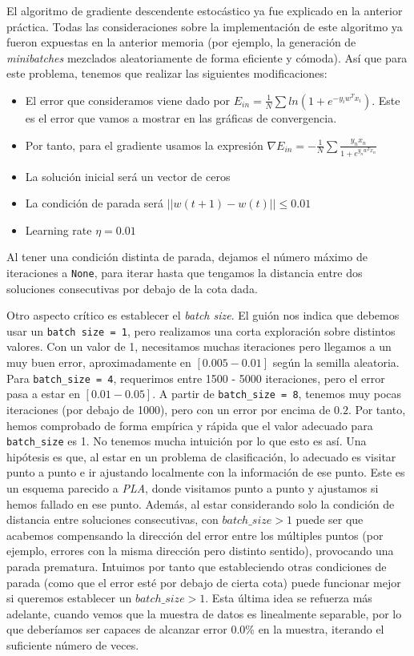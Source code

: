 \documentclass[11pt]{article}
\begin{document}
El algoritmo de gradiente descendente estocástico ya fue explicado en la anterior práctica. Todas las consideraciones sobre la implementación de este algoritmo ya fueron expuestas en la anterior memoria (por ejemplo, la generación de \emph{minibatches} mezclados aleatoriamente de forma eficiente y cómoda). Así que para este problema, tenemos que realizar las siguientes modificaciones:

\begin{itemize}
    \item El error que consideramos viene dado por $E_{in} = \frac{1}{N} \sum ln(1 + e^{-y_i w^T x_i})$. Este es el error que vamos a mostrar en las gráficas de convergencia.
    \item Por tanto, para el gradiente usamos la expresión $\nabla E_{in} = -\frac{1}{N} \sum \frac{y_n x_n}{1+e^{y_n w^T x_n}}$
    \item La solución inicial será un vector de ceros
    \item La condición de parada será $||w(t+1) - w(t)|| \leq 0.01$
    \item Learning rate $\eta = 0.01$
\end{itemize}

Al tener una condición distinta de parada, dejamos el número máximo de iteraciones a \lstinline{None}, para iterar hasta que tengamos la distancia entre dos soluciones consecutivas por debajo de la cota dada.

Otro aspecto crítico es establecer el \emph{batch size}. El guión nos indica que debemos usar un \lstinline{batch size = 1}, pero realizamos una corta exploración sobre distintos valores. Con un valor de 1, necesitamos muchas iteraciones pero llegamos a un muy buen error, aproximadamente en $[0.005 - 0.01]$ según la semilla aleatoria. Para \lstinline{batch_size = 4}, requerimos entre 1500 - 5000 iteraciones, pero el error pasa a estar en $[0.01 - 0.05]$. A partir de \lstinline{batch_size = 8}, tenemos muy pocas iteraciones (por debajo de 1000), pero con un error por encima de $0.2$. Por tanto, hemos comprobado de forma empírica y rápida que el valor adecuado para \lstinline{batch_size} es 1. No tenemos mucha intuición por lo que esto es así. Una hipótesis es que, al estar en un problema de clasificación, lo adecuado es visitar punto a punto e ir ajustando localmente con la información de ese punto. Este es un esquema parecido a \emph{PLA}, donde visitamos punto a punto y ajustamos si hemos fallado en ese punto. Además, al estar considerando solo la condición de distancia entre soluciones consecutivas, con $batch\_size > 1$ puede ser que acabemos compensando la dirección del error entre los múltiples puntos (por ejemplo, errores con la misma dirección pero distinto sentido), provocando una parada prematura. Intuimos por tanto que estableciendo otras condiciones de parada (como que el error esté por debajo de cierta cota) puede funcionar mejor si queremos establecer un $batch\_size > 1$. Esta última idea se refuerza más adelante, cuando vemos que la muestra de datos es linealmente separable, por lo que deberíamos ser capaces de alcanzar error 0.0\% en la muestra, iterando el suficiente número de veces.
\end{document}
